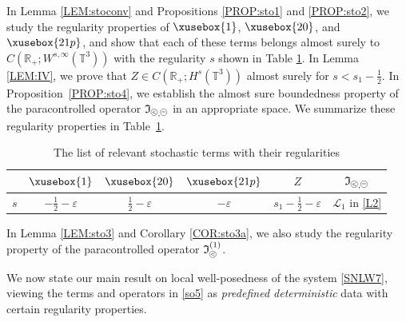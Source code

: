 \documentclass[%
11pt,  reqno]{amsart}
\def\<#1>{\xusebox{#1}}
\newcommand{\pe}{\mathbin{\scaleobj{0.7}{\tikz \draw (0,0) node[shape=circle,draw,inner sep=0pt,minimum size=8.5pt] {\scriptsize  $=$};}}}
\newcommand{\pl}{\mathbin{\scaleobj{0.7}{\tikz \draw (0,0) node[shape=circle,draw,inner sep=0pt,minimum size=8.5pt] {\scriptsize $<$};}}}
\newcommand{\1}{\hspace{0.2mm}\text{I}\hspace{0.2mm}}
\newcommand{\noi}{\noindent}
\newcommand{\R}{\mathbb{R}}
\newcommand{\T}{\mathbb{T}}
\renewcommand{\L}{\mathcal{L}}
\newcommand{\eps}{\varepsilon}
\newcommand{\If}{\mathfrak{I}}
\numberwithin{equation}{section}
\numberwithin{theorem}{section}
\begin{document}
\noi
In  Lemma  \ref{LEM:stoconv} and Propositions \ref{PROP:sto1} and   \ref{PROP:sto2}, 
we  study the regularity properties of $\<1>$, $\<20>$, and  $\<21p>$, 
and show that 
each of these terms  belongs almost surely to 
$C(\R_+; W^{s, \infty}(\T^3))$
with the regularity $s$ shown in Table \ref{TAB:1}.
In  Lemma \ref{LEM:IV}, 
we prove that $Z \in C(\R_+; H^{s}(\T^3))$
almost surely for $s < s_1 - \frac{1}{2}$.
In Proposition~\ref{PROP:sto4}, 
we establish the almost sure boundedness property
of the paracontrolled operator
 $\If_{\pl, \pe}$
in an appropriate space.
We summarize these regularity properties
 in Table~\ref{TAB:1}.


\begin{table}[h]
  \begin{tabular}{|l||c|c|c|c|c|}
\hline
&  \rule{0mm}{5mm} 
\hspace*{2.5mm}  $\<1>$ \hspace*{3mm}
&\hspace*{3mm}  $\<20>$ \hspace*{4mm}
&\hspace*{3mm}  $\<21p>$ \hspace*{4mm}
&\hspace*{4.5mm}  $Z$ \hspace*{5.5mm} 
& $\If_{\pl, \pe}$ 
\\
\hline
\rule[-2.5mm]{0mm}{7mm}
$s$  
\hspace*{1.5mm} & $- \frac12 -\eps$ & $ \frac12 -\eps$ & $-\eps$  
& $s_1 - \frac 12 -\eps$
& \hspace*{2mm}$\L_1$ in \eqref{L2}\hspace*{2mm}
\\
\hline
  \end{tabular}

\vspace{4mm}
  \caption{The list of relevant stochastic terms
  with their regularities}
  \label{TAB:1}
\end{table}

\noi
In  Lemma \ref{LEM:sto3}
and Corollary \ref{COR:sto3a}, 
we also study 
the regularity property
of the paracontrolled operator $ \If_{\pl}^{(1)}$.


We now state our main result
on local well-posedness of the system \eqref{SNLW7}, 
viewing the terms and operators in \eqref{so5}
as {\it predefined deterministic} data
with certain regularity properties.
\end{document}
